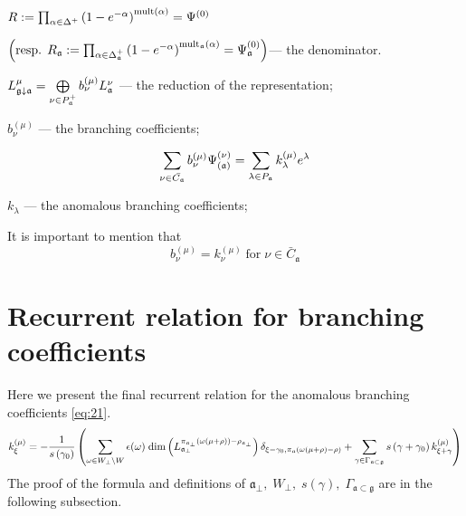 \documentclass[a4paper,12pt]{article}
\theoremstyle{definition} \newtheorem{Def}{Definition}
\begin{document}
$R:=\prod_{\alpha \in \Delta ^{+}}\left( 1-e^{-\alpha }\right) ^{\mathrm{{%
mult}\left( \alpha \right) }}=\Psi ^{\left( 0\right) }\quad $

\noindent $\left( \text{resp. }R_{\frak{a}}:=\prod_{\alpha \in \Delta _{%
\frak{a}}^{+}}\left( 1-e^{-\alpha }\right) ^{\mathrm{mult}_{\frak{a}}\mathrm{%
\left( \alpha \right) }}=\Psi _{\frak{a}}^{\left( 0\right) }\right) $--- the
denominator.

$  L_{\frak{g}\downarrow \frak{a}}^{\mu }=\bigoplus\limits_{\nu \in P_{\frak{a}}^{+}}b_{\nu }^{\left( \mu \right) }L_{\frak{a}}^{\nu }$ --- the reduction of the representation;


$b^{(\mu)}_{\nu}$ --- the branching coefficients;

\begin{equation}
  \label{eq:21}
  \sum_{\nu \in \bar{C_{\mathfrak{a}}}}b_{\nu }^{\left( \mu \right) }\Psi _{\left( \frak{%
        a}\right) }^{\left( \nu \right) }=\sum_{\lambda \in P_{\frak{a}}}k_{\lambda
  }^{\left( \mu \right) }e^{\lambda } 
\end{equation}

 $k_{\lambda}$ --- the anomalous branching coefficients;

It is important to mention that
\begin{equation}
  \label{eq:20}
  b^{(\mu)}_{\nu}=k^{(\mu)}_{\nu} \; \mbox{for} \; \nu\in \bar{C}_{\mathfrak{a}}
\end{equation}

\section{Recurrent relation for branching coefficients}
\label{sec:recurr-form-branch}

Here we present the final recurrent relation for the anomalous branching coefficients \eqref{eq:21}. 
\begin{equation}
  \label{eq:1}
k_{\xi }^{\left( \mu \right) }=-\frac{1}{s\left( \gamma _{0}\right) }\left(
  \sum_{\omega\in W_{\bot}\backslash W} \epsilon(\omega)\; {\rm dim}\left(L^{\pi_{\mathfrak{a}_{\bot}}(\omega(\mu+\rho))-\rho_{\mathfrak{a}_{\bot}}}_{\mathfrak{a}_{\bot}}\right) \delta_{\xi-\gamma_0,\pi_{\mathfrak{a}}(\omega(\mu+\rho)-\rho)}+
\sum_{\gamma \in
\Gamma _{\frak{a}\subset \frak{g}}}s\left( \gamma +\gamma _{0}\right) k_{\xi
+\gamma }^{\left( \mu \right) }\right)   
\end{equation}
The proof of the formula and definitions of $\mathfrak{a}_{\bot},\; W_{\bot},\; s(\gamma),\; \Gamma_{\mathfrak{a}\subset \mathfrak{g}}$ are in the following subsection.
\end{document}
